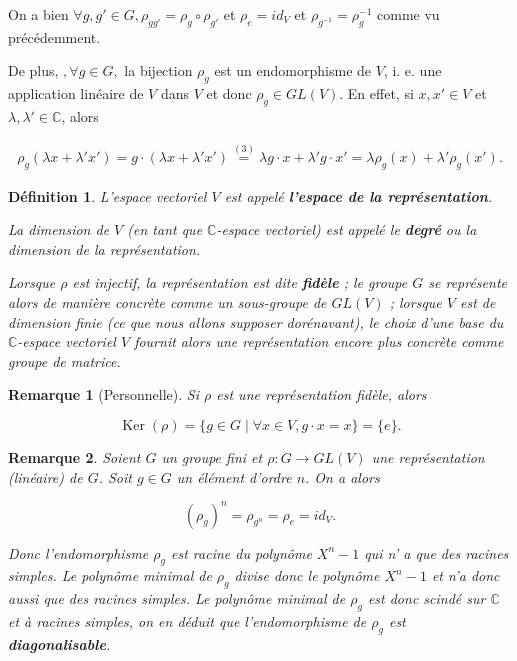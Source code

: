 \documentclass[french]{book}
\newtheorem{definition}{Définition}[section]
\newtheorem*{remark}{Remarque}
\begin{document}
On a bien $\forall g, g' \in G, \rho _{gg'} = \rho_g \circ \rho _{g'}$ et $\rho_e=id_V$ et $\rho _{g ^{-1} } = \rho_g ^{-1} $ comme vu précédemment.

De plus, $, \forall  g \in G, $ la bijection $\rho_g$ est un endomorphisme de $V$, i. e. une application linéaire de $V$ dans $V$ et donc $\rho_g \in GL(V)$. En effet, si $x, x' \in V$ et $\lambda , \lambda' \in \mathbb{C}$, alors

\begin{gather*}
  \rho_g(\lambda x + \lambda' x') = g \cdot(\lambda x+ \lambda'x') \stackrel{(3)}{=} \lambda g \cdot x + \lambda' g \cdot x' = \lambda \rho_g(x) + \lambda'\rho_g(x').
\end{gather*}

\begin{definition}
  L'espace vectoriel $V$ est appelé \textbf{l'espace de la représentation}.

  La dimension de $V$ (en tant que $\mathbb{C}$-espace vectoriel) est appelé le \textbf{degré} ou la dimension de la représentation.

  Lorsque $\rho$ est injectif, la représentation est dite \textbf{fidèle} ; le groupe $G$ se représente alors de manière concrète comme un sous-groupe de $GL(V)$ ; lorsque $V$ est de dimension finie (ce que nous allons supposer dorénavant), le choix d'une base du $\mathbb{C}$-espace vectoriel $V$ fournit alors une représentation encore plus concrète comme groupe de matrice.
\end{definition}

\begin{remark}[Personnelle]
  Si \(\rho\) est une représentation fidèle, alors

  \[\operatorname{Ker}(\rho) = \{ g \in G \mid \forall x \in V, g \cdot x = x \} = \{ e \}. \]
\end{remark}

\begin{remark}
  Soient $G$ un groupe fini et $\rho : G \to GL(V)$ une représentation (linéaire) de $G$. Soit $g \in G$ un élément d'ordre $n$. On a alors

  \[
  (\rho_g)^n = \rho _{g ^{n}} = \rho_e = id_V.
  \]

  Donc l'endomorphisme $\rho_g$ est racine du polynôme $X^{n}-1$ qui n' a que des racines simples. Le polynôme minimal de $\rho_g$ divise donc le polynôme $X ^{n}-1$ et n'a donc aussi que des racines simples. Le polynôme minimal de $\rho_g$ est donc scindé sur $\mathbb{C}$ et à racines simples, on en déduit que l'endomorphisme de $\rho_g$ est \textbf{diagonalisable}.
\end{remark}
\end{document}

